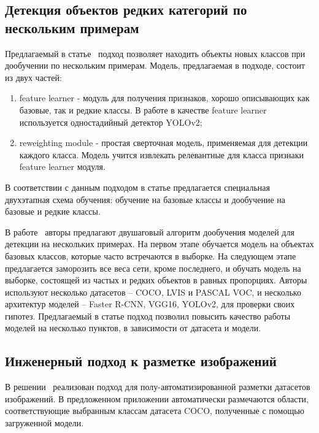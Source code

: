 \documentclass[a4paper,14pt]{article}
\begin{document}
    \subsection{Детекция объектов редких категорий по нескольким примерам}
    
    Предлагаемый в статье~\cite{FSODFeatureReweighting} подход позволяет находить объекты новых классов при дообучении по нескольким примерам.
    Модель, предлагаемая в подходе, состоит из двух частей: 
     \begin{enumerate}
    	[1)]
    	\itemsep0em
    	\item feature learner - модуль для получения признаков, хорошо описывающих как базовые, так и редкие классы. 
    	В работе в качестве feature learner используется одностадийный детектор YOLOv2;
    	\item reweighting module - простая сверточная модель, применяемая для детекции каждого класса. Модель учится извлекать релевантные для класса признаки feature learner модуля.
    \end{enumerate}
	В соответствии с данным подходом в статье предлагается специальная двухэтапная схема обучения: обучение на базовые классы и дообучение на базовые и редкие классы.

    В работе~\cite{wang2020few} авторы предлагают двушаговый алгоритм дообучения моделей для детекции на нескольких примерах.
    На первом этапе обучается модель на объектах базовых классов, которые часто встречаются в выборке.
    На следующем этапе предлагается заморозить все веса сети, кроме последнего, и обучать модель на выборке, состоящей из частых и редких объектов в равных пропорциях.
    Авторы используют несколько датасетов -- COCO, LVIS и PASCAL VOC,
    и несколько архитектур моделей -- Faster R-CNN, VGG16, YOLOv2, для проверки своих гипотез.
    Предлагаемый в статье подход позволил повысить качество работы моделей на несколько пунктов, в зависимости от датасета и модели.
    

    \subsection{Инженерный подход к разметке изображений}

    В решении~\cite{AnnoMage} реализован подход для полу-автоматизированной разметки датасетов изображений.
    В предложенном приложении автоматически размечаются области, соответствующие выбранным классам датасета COCO, полученные с помощью загруженной модели.
\end{document}
